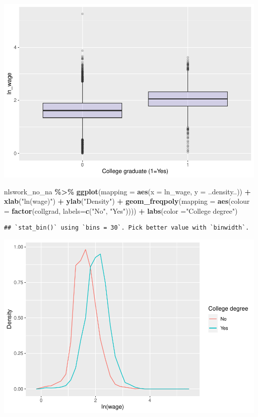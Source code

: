 \documentclass[
]{article}
\newenvironment{Shaded}{\begin{snugshade}}{\end{snugshade}}
\newcommand{\AttributeTok}[1]{\textcolor[rgb]{0.13,0.29,0.53}{#1}}
\newcommand{\FunctionTok}[1]{\textcolor[rgb]{0.13,0.29,0.53}{\textbf{#1}}}
\newcommand{\NormalTok}[1]{#1}
\newcommand{\SpecialCharTok}[1]{\textcolor[rgb]{0.81,0.36,0.00}{\textbf{#1}}}
\newcommand{\StringTok}[1]{\textcolor[rgb]{0.31,0.60,0.02}{#1}}
\begin{document}
\includegraphics{RIntro_files/figure-latex/unnamed-chunk-21-1.pdf}

\begin{Shaded}
\begin{Highlighting}[]
\NormalTok{nlswork\_no\_na }\SpecialCharTok{\%\textgreater{}\%} \FunctionTok{ggplot}\NormalTok{(}\AttributeTok{mapping =} \FunctionTok{aes}\NormalTok{(}\AttributeTok{x =}\NormalTok{ ln\_wage, }\AttributeTok{y =}\NormalTok{ ..density..)) }\SpecialCharTok{+}
    \FunctionTok{xlab}\NormalTok{(}\StringTok{"ln(wage)"}\NormalTok{) }\SpecialCharTok{+}
    \FunctionTok{ylab}\NormalTok{(}\StringTok{"Density"}\NormalTok{) }\SpecialCharTok{+}
    \FunctionTok{geom\_freqpoly}\NormalTok{(}\AttributeTok{mapping =} \FunctionTok{aes}\NormalTok{(}\AttributeTok{colour =} \FunctionTok{factor}\NormalTok{(collgrad, }\AttributeTok{labels=}\FunctionTok{c}\NormalTok{(}\StringTok{"No"}\NormalTok{, }\StringTok{"Yes"}\NormalTok{)))) }\SpecialCharTok{+}
  \FunctionTok{labs}\NormalTok{(}\AttributeTok{color =}\StringTok{"College degree"}\NormalTok{)}
\end{Highlighting}
\end{Shaded}

\begin{verbatim}
## `stat_bin()` using `bins = 30`. Pick better value with `binwidth`.
\end{verbatim}

\includegraphics{RIntro_files/figure-latex/unnamed-chunk-22-1.pdf}
\end{document}
